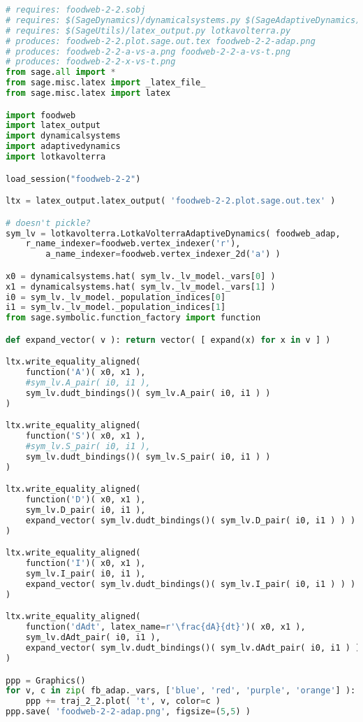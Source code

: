 \begin{lstlisting}[language=Python]
# requires: foodweb-2-2.sobj
# requires: $(SageDynamics)/dynamicalsystems.py $(SageAdaptiveDynamics)/adaptivedynamics.py
# requires: $(SageUtils)/latex_output.py lotkavolterra.py
# produces: foodweb-2-2.plot.sage.out.tex foodweb-2-2-adap.png
# produces: foodweb-2-2-a-vs-a.png foodweb-2-2-a-vs-t.png
# produces: foodweb-2-2-x-vs-t.png
from sage.all import *
from sage.misc.latex import _latex_file_
from sage.misc.latex import latex

import foodweb
import latex_output
import dynamicalsystems
import adaptivedynamics
import lotkavolterra

load_session("foodweb-2-2")

ltx = latex_output.latex_output( 'foodweb-2-2.plot.sage.out.tex' )

# doesn't pickle?
sym_lv = lotkavolterra.LotkaVolterraAdaptiveDynamics( foodweb_adap,
	r_name_indexer=foodweb.vertex_indexer('r'),
        a_name_indexer=foodweb.vertex_indexer_2d('a') )

x0 = dynamicalsystems.hat( sym_lv._lv_model._vars[0] )
x1 = dynamicalsystems.hat( sym_lv._lv_model._vars[1] )
i0 = sym_lv._lv_model._population_indices[0] 
i1 = sym_lv._lv_model._population_indices[1] 
from sage.symbolic.function_factory import function

def expand_vector( v ): return vector( [ expand(x) for x in v ] )

ltx.write_equality_aligned(
    function('A')( x0, x1 ),
    #sym_lv.A_pair( i0, i1 ),
    sym_lv.dudt_bindings()( sym_lv.A_pair( i0, i1 ) )
)

ltx.write_equality_aligned(
    function('S')( x0, x1 ),
    #sym_lv.S_pair( i0, i1 ),
    sym_lv.dudt_bindings()( sym_lv.S_pair( i0, i1 ) )
)

ltx.write_equality_aligned(
    function('D')( x0, x1 ),
    sym_lv.D_pair( i0, i1 ),
    expand_vector( sym_lv.dudt_bindings()( sym_lv.D_pair( i0, i1 ) ) )
)

ltx.write_equality_aligned(
    function('I')( x0, x1 ),
    sym_lv.I_pair( i0, i1 ),
    expand_vector( sym_lv.dudt_bindings()( sym_lv.I_pair( i0, i1 ) ) )
)

ltx.write_equality_aligned(
    function('dAdt', latex_name=r'\frac{dA}{dt}')( x0, x1 ),
    sym_lv.dAdt_pair( i0, i1 ),
    expand_vector( sym_lv.dudt_bindings()( sym_lv.dAdt_pair( i0, i1 ) ) )
)

ppp = Graphics()
for v, c in zip( fb_adap._vars, ['blue', 'red', 'purple', 'orange'] ):
    ppp += traj_2_2.plot( 't', v, color=c )
ppp.save( 'foodweb-2-2-adap.png', figsize=(5,5) )


\end{lstlisting}

